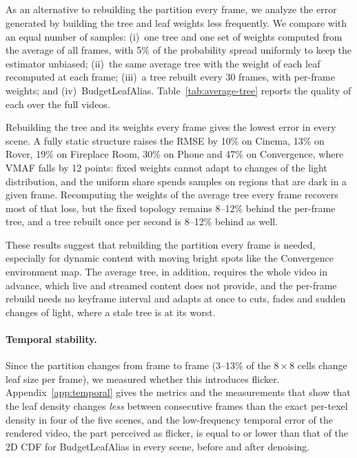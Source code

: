 \documentclass[acmtog,review]{acmart}
\begin{document}
\subsection{\texorpdfstring{}{Frequency of frame partitions}}
\label{sec:static}

\newbegin
As an alternative to rebuilding the partition every frame, we analyze the error generated by building the tree and leaf weights less frequently. We compare with an equal number of samples: (i)~one tree and one set of weights computed from the average of all frames, with 5\% of the probability spread uniformly to keep the estimator unbiased; (ii)~the same average tree with the weight of each leaf recomputed at each frame; (iii)~a tree rebuilt every 30 frames, with per-frame weights; and (iv)~BudgetLeafAlias. Table~\ref{tab:average-tree} reports the quality of each over the full videos.



Rebuilding the tree and its weights every frame gives the lowest error in every scene. A fully static structure raises the RMSE by 10\% on Cinema, 13\% on Rover, 19\% on Fireplace Room, 30\% on Phone and 47\% on Convergence, where VMAF falls by 12 points: fixed weights cannot adapt to changes of the light distribution, and the uniform share spends samples on regions that are dark in a given frame. Recomputing the weights of the average tree every frame recovers most of that loss, but the fixed topology remains 8--12\% behind the per-frame tree, and a tree rebuilt once per second is 8--12\% behind as well.

These results suggest that rebuilding the partition every frame is needed, especially for dynamic content with moving bright spots like the Convergence environment map. The average tree, in addition, requires the whole video in advance, which live and streamed content does not provide, and the per-frame rebuild needs no keyframe interval and adapts at once to cuts, fades and sudden changes of light, where a stale tree is at its worst.

\paragraph{Temporal stability.} Since the partition changes from frame to frame (3--13\% of the $8{\times}8$ cells change leaf size per frame), we measured whether this introduces flicker. Appendix~\ref{app:temporal} gives the metrics and the measurements that show that the leaf density changes \emph{less} between consecutive frames than the exact per-texel density in four of the five scenes, and the low-frequency temporal error of the rendered video, the part perceived as flicker, is equal to or lower than that of the 2D CDF for BudgetLeafAlias in every scene, before and after denoising. 
\newend
\end{document}
